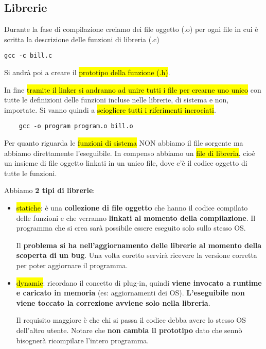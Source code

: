 \subsection{Librerie}

Durante la fase di compilazione creiamo dei file oggetto (.o) per ogni file in cui è scritta la descrizione delle funzioni di libreria (.c)

\begin{lstlisting}
gcc -c bill.c
\end{lstlisting}

Si andrà poi a creare il \hl{prototipo della funzione (.h)}.

In fine \hl{tramite il linker si andranno ad unire tutti i file per crearne uno unico} con tutte le definizioni delle funzioni incluse nelle librerie, di sistema e non, importate. Si vanno quindi a \hl{sciogliere tutti i riferimenti incrociati}.

\begin{lstlisting}
	gcc -o program program.o bill.o
\end{lstlisting}

Per quanto riguarda le \hl{funzioni di sistema} NON abbiamo il file sorgente ma abbiamo direttamente l'eseguibile. In compenso abbiamo un \hl{file di libreria}, cioè un insieme di file oggetto linkati in un unico file, dove c'è il codice oggetto di tutte le funzioni.

Abbiamo \textbf{2 tipi di librerie}:
\begin{itemize}
	\item \hl{statiche}: è una \textbf{collezione di file oggetto} che hanno il codice compilato delle funzioni e che verranno \textbf{linkati al momento della compilazione}. Il programma che si crea sarà possibile essere eseguito solo sullo stesso OS.
		
		Il \textbf{problema si ha nell'aggiornamento delle librerie al momento della scoperta di un bug}. Una volta coretto servirà ricevere la versione corretta per poter aggiornare il programma.
		
	\item \hl{dynamic}: ricordano il concetto di plug-in, quindi \textbf{viene invocato a runtime e caricato in memoria} (es: aggiornamenti dei OS). \textbf{L'eseguibile non viene toccato la correzione avviene solo nella libreria}.
	
		Il requisito maggiore è che chi si passa il codice debba avere lo stesso OS dell'altro utente. Notare che \textbf{non cambia il prototipo} dato che sennò bisognerà ricompilare l'intero programma.
\end{itemize}


